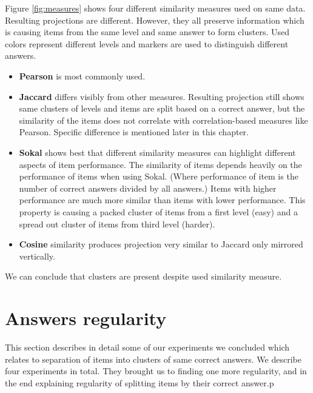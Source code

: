 \documentclass[
  digital, %
  table,   %
  nolof,     %
  nolot,     %
  nocover,
  color,
  final, %
]{fithesis3}
\begin{document}
Figure \ref{fig:measures} shows four different similarity measures used on same data. Resulting projections are different. However, they all preserve information which is causing items from the same level and same answer to form clusters. Used colors represent different levels and markers are used to distinguish different answers.


\begin{itemize}
\item
  \textbf{Pearson} is most commonly used.

\item
  \textbf{Jaccard} differs visibly from other measures. Resulting projection still shows same clusters of levels and items are split based on a correct answer, but the similarity of the items does not correlate with correlation-based measures like Pearson. Specific difference is mentioned later in this chapter.

\item
  \textbf{Sokal} shows best that different similarity measures can highlight different aspects of item performance. The similarity of items depends heavily on the performance of items when using Sokal. (Where performance of item is the number of correct answers divided by all answers.) Items with higher performance are much more similar than items with lower performance. This property is causing a packed cluster of items from a first level (easy) and a spread out cluster of items from third level (harder).

\item
  \textbf{Cosine} similarity produces projection very similar to Jaccard only mirrored vertically.
\end{itemize}

We can conclude that clusters are present despite used similarity measure.


\section{Answers regularity}\label{evaulation-answers-regularity}

This section describes in detail some of our experiments we concluded which relates to separation of items into clusters of same correct answers. We describe four experiments in total. They brought us to finding one more regularity, and in the end explaining regularity of splitting items by their correct answer.p
\end{document}

